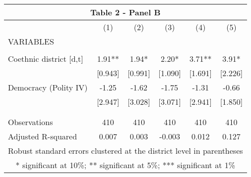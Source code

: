 \begin{tabular}{lccccc}
\multicolumn{6}{c}{Table 2 - Panel B} \\ \hline
 & (1) & (2) & (3) & (4) & (5) \\
VARIABLES &  &  &  &  &  \\ \hline
 &  &  &  &  &  \\
Coethnic district [d,t] & 1.91** & 1.94* & 2.20* & 3.71** & 3.91* \\
 & [0.943] & [0.991] & [1.090] & [1.691] & [2.226] \\
Democracy (Polity IV) & -1.25 & -1.62 & -1.75 & -1.31 & -0.66 \\
 & [2.947] & [3.028] & [3.071] & [2.941] & [1.850] \\
 &  &  &  &  &  \\
 &  &  &  &  &  \\
Observations & 410 & 410 & 410 & 410 & 410 \\
 Adjusted R-squared & 0.007 & 0.003 & -0.003 & 0.012 & 0.127 \\ \hline
\multicolumn{6}{c}{ Robust standard errors clustered at the district level in parentheses} \\
\multicolumn{6}{c}{ * significant at 10\%; ** significant at 5\%; *** significant at 1\%} \\
\end{tabular}
